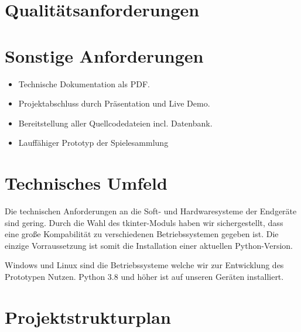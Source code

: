 \documentclass[14pt]{scrartcl}
\begin{document}
\section{Qualitätsanforderungen}


\section{Sonstige Anforderungen}
\begin{itemize}
    \item Technische Dokumentation als PDF.
    \item Projektabschluss durch Präsentation und Live Demo.
    \item Bereitstellung aller Quellcodedateien incl. Datenbank.
    \item Lauffähiger Prototyp der Spielesammlung
\end{itemize}

\section{Technisches Umfeld}

Die technischen Anforderungen an die Soft- und Hardwaresysteme der Endgeräte sind gering.
Durch die Wahl des tkinter-Moduls haben wir sichergestellt, dass eine große Kompabilität zu verschiedenen Betriebssystemen gegeben ist. Die einzige Vorraussetzung ist
somit die Installation einer aktuellen Python-Version.\par 

Windows und Linux sind die Betriebssysteme welche wir zur Entwicklung des Prototypen Nutzen. Python 3.8 und höher ist auf unseren Geräten installiert.\par

\newpage

\section{Projektstrukturplan}
\end{document}
